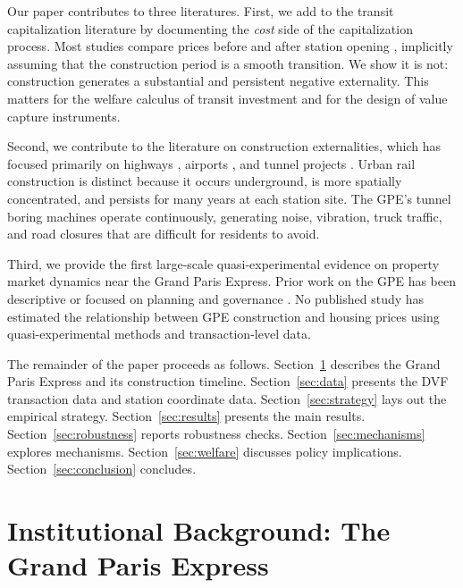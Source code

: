 \documentclass[12pt]{article}
\begin{document}
Our paper contributes to three literatures. First, we add to the transit capitalization literature by documenting the \textit{cost} side of the capitalization process. Most studies compare prices before and after station opening \citep{gibbons2005valuing, billings2011estimating, ahlfeldt2015economics, baum2018transit}, implicitly assuming that the construction period is a smooth transition. We show it is not: construction generates a substantial and persistent negative externality. This matters for the welfare calculus of transit investment and for the design of value capture instruments.

Second, we contribute to the literature on construction externalities, which has focused primarily on highways \citep{kuminoff2010environmental}, airports \citep{mcmillen2004airport}, and tunnel projects \citep{gamper2022infrastructure}. Urban rail construction is distinct because it occurs underground, is more spatially concentrated, and persists for many years at each station site. The GPE's tunnel boring machines operate continuously, generating noise, vibration, truck traffic, and road closures that are difficult for residents to avoid.

Third, we provide the first large-scale quasi-experimental evidence on property market dynamics near the Grand Paris Express. Prior work on the GPE has been descriptive \citep{musikyao2025land} or focused on planning and governance \citep{beaucire2018grand}. No published study has estimated the relationship between GPE construction and housing prices using quasi-experimental methods and transaction-level data.

The remainder of the paper proceeds as follows. Section~\ref{sec:background} describes the Grand Paris Express and its construction timeline. Section~\ref{sec:data} presents the DVF transaction data and station coordinate data. Section~\ref{sec:strategy} lays out the empirical strategy. Section~\ref{sec:results} presents the main results. Section~\ref{sec:robustness} reports robustness checks. Section~\ref{sec:mechanisms} explores mechanisms. Section~\ref{sec:welfare} discusses policy implications. Section~\ref{sec:conclusion} concludes.


\section{Institutional Background: The Grand Paris Express}
\label{sec:background}
\end{document}
